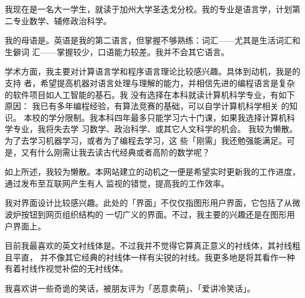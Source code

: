 

我现在是一名大一学生，就读于加州大学圣迭戈分校。我的专业是语言学，计划第二专业数学、辅修政治科学。

我的母语是。英语是我的第二语言，但掌握不够熟练：词汇——尤其是生活词汇和生僻词
汇——掌握较少，口语能力较差。我并不会其它语言。


学术方面，我主要对计算语言学和程序语言理论比较感兴趣。具体到动机，我是的支持
者，希望提高机器对语言处理与理解的能力，并相信先进的编程语言是复杂的软件项目如人工智能的基石。我
没有选择在本科就读计算机科学专业，有如下原因：
\@ulist
  \@item 我已有多年编程经验，有算法竞赛的基础，可以自学计算机科学相关
    的知识。
  \@item 本校的学分限制。我本科四年最多只能学习六十门课，如果我选择计算机科学专业，我将失去学
    习数学、政治科学、或其它人文科学的机会。
  \@item 我较为懒散。为了去学习机器学习，或者为了编程去学习，这
    些「刚需」我还勉强能满足。可是，又有什么刚需让我去读古代经典或者高阶的数学呢？


如上所述，我较为懒散。本网站建立的动机之一便是希望实时更新我的工作进度，通过发布至互联网产生有人
监视的错觉，提高我的工作效率。

我对界面设计比较感兴趣。此处的「界面」不仅仅指图形用户界面，它包括了从微波炉按钮到网页组织结构的
一切广义的界面。不过，我主要的兴趣还是在图形用户界面上。

目前我最喜欢的英文衬线体是。不过我并不觉得它算真正意义的衬线体，其衬线粗且平直，
并不像其它经典的衬线体一样有尖锐的衬线。我更多地是将其看作一种有着衬线作视觉补偿的无衬线体。


我喜欢讲一些奇诡的笑话，被朋友评为「恶意卖萌」、「爱讲冷笑话」。
